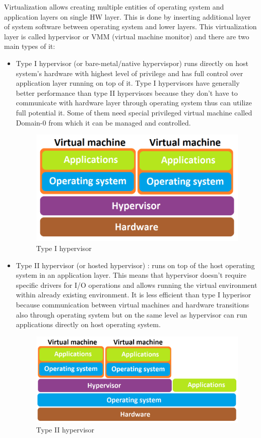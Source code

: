 Virtualization allows creating multiple entities of operating system and application layers on single HW layer. This is done by inserting additional layer of system software between operating system and lower layers. This virtualization layer is called hypervisor or VMM (virtual machine monitor) and there are two main types of it:
\begin{itemize}
\item Type I hypervisor (or bare-metal/native hypervispor) \label{type_i_hyp} runs directly on host system's hardware with highest level of privilege and has full control over application layer running on top of it. Type I hypervisors have generally better performance than type II hypervisors because they don't have to communicate with hardware layer through operating system thus can utilize full potential it. Some of them need special privileged virtual machine called Domain-0 from which it can be managed and controlled.

\begin{figure}[H]
\centering
\includegraphics[scale=0.4]{hyp-type-I.png}
\caption{Type I hypervisor}
\end{figure}

\item Type II hypervisor (or hosted hypervisor) \label{type_ii_hyp}: runs on top of the host operating system in an application layer. This means that hypervisor doesn't require specific drivers for I/O operations and allows running the virtual environment within already existing environment. It is less efficient than type I hyperisor because communication between virtual machines and hardware transitions also through operating system but on the same level as hypervisor can run applications directly on host operating system.

\begin{figure}[H]
\centering
\includegraphics[scale=0.4]{hyp-type-II.png}
\caption{Type II hypervisor}
\end{figure}


\end{itemize}
